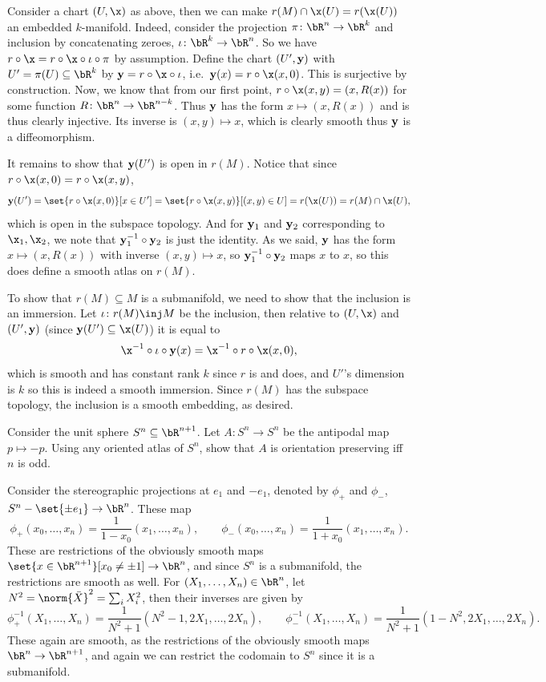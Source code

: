     \item Consider a chart $(U,\x)$ as above, then we can make $r(M)\cap\x(U)=r(\x(U))$ an embedded $k$-manifold.
    Indeed, consider the projection $\pi\colon\bR^n\to\bR^k$ and inclusion by concatenating zeroes, $\iota\colon\bR^k\to\bR^n$.
    So we have $r\circ\x=r\circ\x\circ\iota\circ\pi$ by assumption.
    Define the chart $(U',{\bf y})$ with $U'=\pi(U)\subseteq\bR^k$ by $\y=r\circ\x\circ\iota$, i.e.\ $\y(x)=r\circ\x(x,0)$.
    This is surjective by construction.
    Now, we know that from our first point, $r\circ\x(x,y)=(x,R(x))$ for some function $R\colon\bR^n\to\bR^{n-k}$.
    Thus ${\bf y}$ has the form $x\mapsto(x,R(x))$ and is thus clearly injective.
    Its inverse is $(x,y)\mapsto x$, which is clearly smooth thus ${\bf y}$ is a diffeomorphism.

    It remains to show that ${\bf y}(U')$ is open in $r(M)$.
    Notice that since $r\circ\x(x,0)=r\circ\x(x,y)$,
    $$ \y(U') = \set{r\circ\x(x,0)}[x\in U'] = \set{r\circ\x(x,y)}[(x,y)\in U] = r(\x(U)) = r(M)\cap\x(U), $$
    which is open in the subspace topology.
    And for ${\bf y}_1$ and ${\bf y}_2$ corresponding to $\x_1,\x_2$, we note that ${\bf y}_1^{-1}\circ{\bf y}_2$ is just the identity.
    As we said, ${\bf y}$ has the form $x\mapsto(x,R(x))$ with inverse $(x,y)\mapsto x$, so ${\bf y}_1^{-1}\circ{\bf y}_2$ maps $x$ to $x$, so this does define a smooth atlas on $r(M)$.

    To show that $r(M)\subseteq M$ is a submanifold, we need to show that the inclusion is an immersion.
    Let $\iota\colon r(M)\inj M$ be the inclusion, then relative to $(U,\x)$ and $(U',{\bf y})$ (since $\y(U')\subseteq\x(U)$) it is equal to
    $$ \x^{-1}\circ\iota\circ\y(x) = \x^{-1}\circ r\circ\x(x,0) , $$
    which is smooth and has constant rank $k$ since $r$ is and does, and $U'$'s dimension is $k$ so this is indeed a smooth immersion.
    Since $r(M)$ has the subspace topology, the inclusion is a smooth embedding, as desired.
\eenum

\bprob

    Consider the unit sphere $S^n\subseteq\bR^{n+1}$.
    Let $A\colon S^n\to S^n$ be the antipodal map $p\mapsto-p$.
    Using any oriented atlas of $S^n$, show that $A$ is orientation preserving iff $n$ is odd.

\eprob

Consider the stereographic projections at $e_1$ and $-e_1$, denoted by $\phi_+$ and $\phi_-$, $S^n-\set{\pm e_1}\to\bR^n$.
These map
$$ \phi_+(x_0,\dots,x_n) = \frac1{1-x_0}(x_1,\dots,x_n),\qquad \phi_-(x_0,\dots,x_n) = \frac1{1+x_0}(x_1,\dots,x_n) . $$
These are restrictions of the obviously smooth maps $\set{x\in\bR^{n+1}}[x_0\neq\pm1]\to\bR^n$, and since $S^n$ is a submanifold, the restrictions are smooth as well.
For $(X_1,\dots,X_n)\in\bR^n$, let $N^2=\norm{\bar X}^2=\sum_iX_i^2$, then their inverses are given by
$$ \phi_+^{-1}(X_1,\dots,X_n) = \frac1{N^2+1}(N^2-1,2X_1,\dots,2X_n),\qquad \phi_-^{-1}(X_1,\dots,X_n) = \frac1{N^2+1}(1-N^2,2X_1,\dots,2X_n) . $$
These again are smooth, as the restrictions of the obviously smooth maps $\bR^n\to\bR^{n+1}$, and again we can restrict the codomain to $S^n$ since it is a submanifold.

